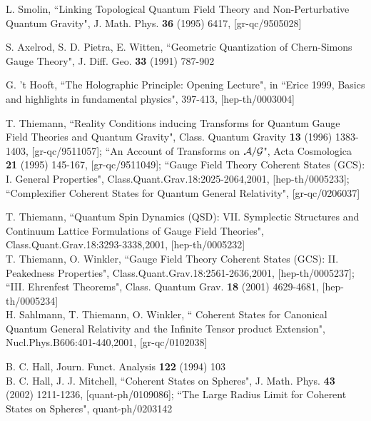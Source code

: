 \documentclass[12pt]{report}
\begin{document}
\begin{thebibliography}{99}
 L. Smolin, ``Linking Topological Quantum Field Theory and 
Non-Perturbative Quantum Gravity", J. Math. Phys. {\bf 36} (1995)
6417, [gr-qc/9505028]

 S. Axelrod, S. D. Pietra, E. Witten, ``Geometric
Quantization of Chern-Simons Gauge Theory", J. Diff. Geo. {\bf 33} (1991)
787-902

 G. 't Hooft, ``The Holographic Principle: Opening Lecture",
in ``Erice 1999, Basics and highlights in fundamental physics", 397-413, 
[hep-th/0003004] 

 T. Thiemann, ``Reality Conditions inducing Transforms for
Quantum Gauge Field Theories and Quantum Gravity", 
Class. Quantum Gravity {\bf 13} (1996) 1383-1403, [gr-qc/9511057];
``An Account of Transforms on ${\cal A}/{\cal G}$",
Acta Cosmologica {\bf 21} (1995) 145-167, [gr-qc/9511049];
``Gauge Field Theory Coherent States (GCS): I. General
Properties", Class.Quant.Grav.18:2025-2064,2001, [hep-th/0005233];
``Complexifier Coherent States for Quantum General Relativity",
[gr-qc/0206037]


 T. Thiemann, ``Quantum Spin Dynamics (QSD): VII. 
Symplectic Structures and Continuum Lattice Formulations of
Gauge Field Theories", Class.Quant.Grav.18:3293-3338,2001,
[hep-th/0005232]\\
T. Thiemann, O. Winkler, ``Gauge Field Theory Coherent States
(GCS): II. Peakedness Properties", Class.Quant.Grav.18:2561-2636,2001,
[hep-th/0005237]; ``III. Ehrenfest Theorems", 
Class. Quantum Grav. {\bf 18} (2001) 4629-4681, [hep-th/0005234]\\
H. Sahlmann, T. Thiemann, O. Winkler, ``
Coherent States for Canonical Quantum General Relativity and the Infinite
Tensor product Extension", Nucl.Phys.B606:401-440,2001, [gr-qc/0102038]

 B. C. Hall, Journ. Funct. Analysis {\bf 122} (1994) 103\\
B. C. Hall, J. J. Mitchell, ``Coherent States on Spheres", 
J. Math. Phys. {\bf 43} (2002) 1211-1236, [quant-ph/0109086];
``The Large Radius Limit for Coherent States on Spheres", quant-ph/0203142 


\end{thebibliography}
\end{document}
